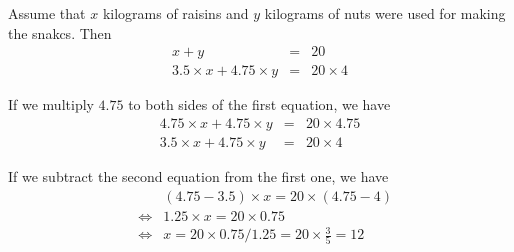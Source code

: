 \documentclass{article}
\begin{document}
\begin{description}
\begin{description}
Assume that $x$ kilograms of raisins and $y$ kilograms of nuts were used for making the snakcs.
Then
\begin{eqnarray*}
x + y &=& 20
\\
3.5 \times x + 4.75 \times y &=& 20 \times 4
\end{eqnarray*}

If we multiply $4.75$ to both sides of the first equation,
we have
\begin{eqnarray*}
4.75 \times x + 4.75 \times y &=& 20 \times 4.75
\\
3.5 \times x + 4.75 \times y &=& 20 \times 4
\end{eqnarray*}

If we subtract the second equation from the first one,
we have
\begin{eqnarray*}
&&(4.75 - 3.5) \times x = 20 \times (4.75 - 4)
\\
&\Leftrightarrow&
1.25 \times x = 20 \times 0.75
\\
&\Leftrightarrow&
x = 20 \times 0.75 / 1.25 = 20 \times \frac{3}{5} = 12
\end{eqnarray*}






\end{description}


\end{description}
\end{document}
